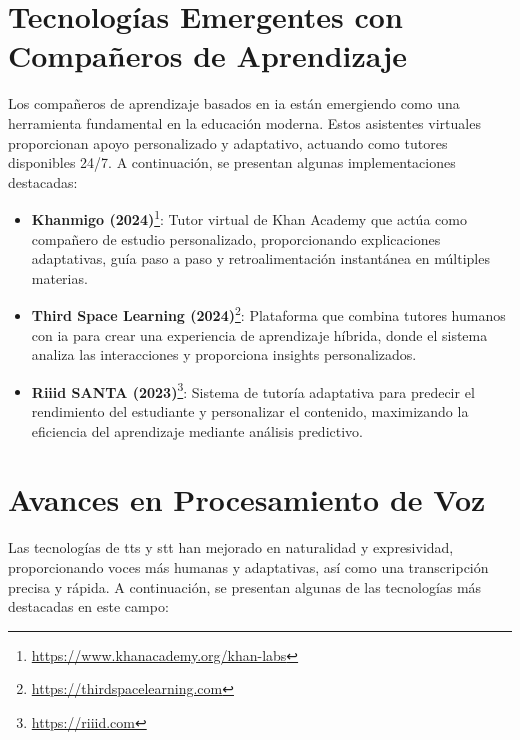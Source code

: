 \section{Tecnologías Emergentes con Compañeros de Aprendizaje}

Los compañeros de aprendizaje basados en \gls{ia} están emergiendo como una herramienta fundamental en la educación moderna. Estos asistentes virtuales proporcionan apoyo personalizado y adaptativo, actuando como tutores disponibles 24/7. A continuación, se presentan algunas implementaciones destacadas:

\begin{itemize}
  \item \textbf{Khanmigo (2024)}\footnote{\url{https://www.khanacademy.org/khan-labs}}: Tutor virtual de Khan Academy que actúa como compañero de estudio personalizado, proporcionando explicaciones adaptativas, guía paso a paso y retroalimentación instantánea en múltiples materias.

  \item \textbf{Third Space Learning (2024)}\footnote{\url{https://thirdspacelearning.com}}: Plataforma que combina tutores humanos con \gls{ia} para crear una experiencia de aprendizaje híbrida, donde el sistema analiza las interacciones y proporciona insights personalizados.

  \item \textbf{Riiid SANTA (2023)}\footnote{\url{https://riiid.com}}: Sistema de tutoría adaptativa para predecir el rendimiento del estudiante y personalizar el contenido, maximizando la eficiencia del aprendizaje mediante análisis predictivo.
\end{itemize}

\section{Avances en Procesamiento de Voz}

Las tecnologías de \gls{tts} y \gls{stt} han mejorado en naturalidad y expresividad, proporcionando voces más humanas y adaptativas, así como una transcripción precisa y rápida. A continuación, se presentan algunas de las tecnologías más destacadas en este campo:

